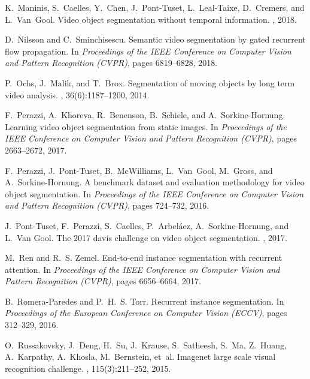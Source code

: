 \documentclass[10pt,twocolumn,letterpaper]{article}
\begin{document}
\begin{thebibliography}{10}
K.~Maninis, S.~Caelles, Y.~Chen, J.~Pont-Tuset, L.~Leal-Taixe, D.~Cremers, and
  L.~Van~Gool.
\newblock Video object segmentation without temporal information.
,
  2018.

D.~Nilsson and C.~Sminchisescu.
\newblock Semantic video segmentation by gated recurrent flow propagation.
\newblock In {\em Proceedings of the IEEE Conference on Computer Vision and
  Pattern Recognition (CVPR)}, pages 6819--6828, 2018.

P.~Ochs, J.~Malik, and T.~Brox.
\newblock Segmentation of moving objects by long term video analysis.
,
  36(6):1187--1200, 2014.

F.~Perazzi, A.~Khoreva, R.~Benenson, B.~Schiele, and A.~Sorkine-Hornung.
\newblock Learning video object segmentation from static images.
\newblock In {\em Proceedings of the IEEE Conference on Computer Vision and
  Pattern Recognition (CVPR)}, pages 2663--2672, 2017.

F.~Perazzi, J.~Pont-Tuset, B.~McWilliams, L.~Van~Gool, M.~Gross, and
  A.~Sorkine-Hornung.
\newblock A benchmark dataset and evaluation methodology for video object
  segmentation.
\newblock In {\em Proceedings of the IEEE Conference on Computer Vision and
  Pattern Recognition (CVPR)}, pages 724--732, 2016.

J.~Pont-Tuset, F.~Perazzi, S.~Caelles, P.~Arbel\'aez, A.~Sorkine-Hornung, and
  L.~{Van Gool}.
\newblock The 2017 davis challenge on video object segmentation.
, 2017.

M.~Ren and R.~S. Zemel.
\newblock End-to-end instance segmentation with recurrent attention.
\newblock In {\em Proceedings of the IEEE Conference on Computer Vision and
  Pattern Recognition (CVPR)}, pages 6656--6664, 2017.

B.~Romera-Paredes and P.~H.~S. Torr.
\newblock Recurrent instance segmentation.
\newblock In {\em Proceedings of the European Conference on Computer Vision
  (ECCV)}, pages 312--329, 2016.

O.~Russakovsky, J.~Deng, H.~Su, J.~Krause, S.~Satheesh, S.~Ma, Z.~Huang,
  A.~Karpathy, A.~Khosla, M.~Bernstein, et~al.
\newblock Imagenet large scale visual recognition challenge.
, 115(3):211--252,
  2015.


\end{thebibliography}
\end{document}
